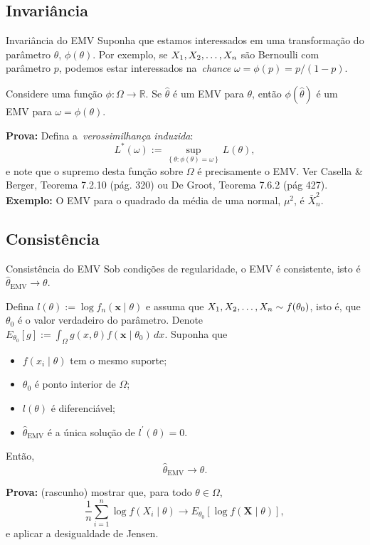 \subsection*{Invariância} 

\begin{frame}{Invariância do EMV}
Suponha que estamos interessados em uma transformação do parâmetro $\theta$, $\phi(\theta)$.
Por exemplo, se $X_1, X_2, \ldots, X_n$ são Bernoulli com parâmetro $p$,  podemos estar interessados na~\textit{chance} $\omega = \phi(p) = p/(1-p)$.
\begin{theo}
 Considere uma função $\phi : \Omega \to \mathbb{R}$.
 Se $\hat{\theta}$ é um EMV para $\theta$, então $\phi(\hat{\theta})$ é um EMV para $\omega = \phi(\theta)$.
\end{theo}
\textbf{Prova:} Defina a~\textit{verossimilhança induzida}:
\[ L^\ast(\omega) := \sup_{\left\{ \theta: \phi(\theta) = \omega \right\}} L(\theta), \]
e note que o supremo desta função sobre $\Omega$ é precisamente o EMV.
Ver Casella \& Berger, Teorema 7.2.10 (pág. 320) ou De Groot, Teorema 7.6.2 (pág 427).
\textbf{Exemplo:} O EMV para o quadrado da média de uma normal, $\mu^2$, é $\bar{X}_n^2$.
\end{frame}

\subsection*{Consistência} 

\begin{frame}{Consistência do EMV}
Sob condições de regularidade, o EMV é consistente, isto é $\hat{\theta}_{\text{EMV}} \xrightarrow{} \theta$.
\begin{theo}
Defina $l(\theta) := \log f_n(\boldsymbol{x} \mid \theta)$ e assuma que $X_1, X_2, \ldots, X_n \sim f(\theta_0)$, isto é, que $\theta_0$ é o valor verdadeiro do parâmetro.
Denote $E_{\theta_0}[g] := \int_{\Omega} g(x, \theta) f(\boldsymbol{x} \mid \theta_0)\, dx$.
 Suponha que 
 \begin{itemize}
  \item $f(x_i \mid \theta)$ tem o mesmo suporte;
  \item $\theta_0$ é ponto interior de $\Omega$;
  \item $l(\theta)$ é diferenciável;
  \item $\hat{\theta}_{\text{EMV}}$ é a única solução de $l^\prime(\theta) = 0$.
 \end{itemize}
   Então,
  $$\hat{\theta}_{\text{EMV}} \xrightarrow{} \theta.$$
\end{theo}
\textbf{Prova:} (rascunho) mostrar que, para todo $\theta \in \Omega$,
\[ \frac{1}{n} \sum_{i=1}^n \log f(X_i \mid \theta) \xrightarrow{} E_{\theta_0}\left[ \log f(\boldsymbol{X} \mid \theta) \right], \]
e aplicar a desigualdade de Jensen.
\end{frame}

